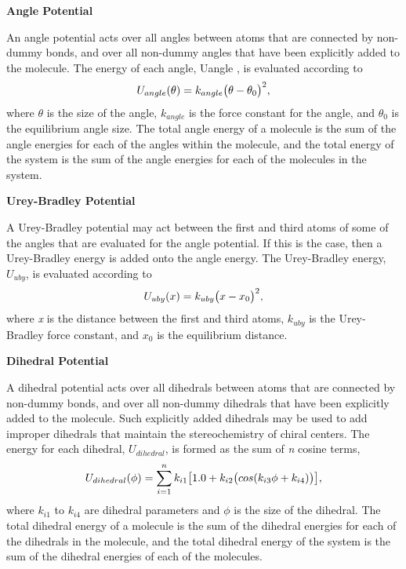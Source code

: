 \documentclass[letterpaper,10pt,english]{sphinxmanual}
\begin{document}
\textbf{Angle Potential}

An angle potential acts over all angles between atoms that are connected by non-dummy bonds, and over all
non-dummy angles that have been explicitly added to the molecule. The energy of each angle, Uangle , is evaluated
according to
\begin{gather}
\begin{split}U_{angle}(\theta) = k_{angle}\bigl(\theta-\theta_0\bigr)^2,\end{split}\notag
\end{gather}
where \(\theta\) is the size of the angle, \(k_{angle}\) is the force constant for the angle, and \(\theta_0\) is the equilibrium angle size. The total angle energy of a molecule is the sum of the angle energies for each of the angles within the molecule, and the total energy of the system is the sum of the angle energies for each of the molecules in the system.

\textbf{Urey-Bradley Potential}

A Urey-Bradley potential may act between the first and third atoms of some of the angles that are evaluated for the angle potential. If this is the case, then a Urey-Bradley energy is added onto the angle energy. The Urey-Bradley energy, \(U_{uby}\), is evaluated according to
\begin{gather}
\begin{split}U_{uby}(x) = k_{uby}\bigl(x-x_0\bigr)^2,\end{split}\notag
\end{gather}
where \emph{x} is the distance between the first and third atoms, \(k_{uby}\) is the Urey-Bradley force constant, and \(x_0\) is the equilibrium distance.

\textbf{Dihedral Potential}

A dihedral potential acts over all dihedrals between atoms that are connected by non-dummy bonds, and over all non-dummy dihedrals that have been explicitly added to the molecule. Such explicitly added dihedrals may be used to add improper dihedrals that maintain the stereochemistry of chiral centers. The energy for each dihedral, \(U_{dihedral}\), is formed as the sum of \emph{n} cosine terms,
\begin{gather}
\begin{split}U_{dihedral}(\phi) = \sum_{i=1}^{n} k_{i1}\bigl[1.0 + k_{i2}\bigl(cos(k_{i3}\phi + k_{i4})\bigr)\bigr],\end{split}\notag
\end{gather}
where \(k_{i1}\) to \(k_{i4}\) are dihedral parameters and \(\phi\) is the size of the dihedral. The total dihedral energy of a molecule is the sum of the dihedral energies for each of the dihedrals in the molecule, and the total dihedral energy of the system is the sum of the dihedral energies of each of the molecules.
\end{document}
